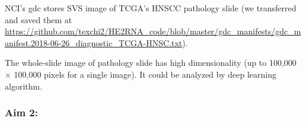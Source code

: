 \documentclass[12pt, a4paper]{article}
\begin{document}

NCI's \acrfull{gdc} stores SVS image of TCGA's HNSCC pathology slide (we transferred and saved them at \url{https://github.com/texchi2/HE2RNA_code/blob/master/gdc_manifests/gdc_manifest.2018-06-26_diagnostic_TCGA-HNSC.txt}).



The whole-slide image of pathology slide has high dimensionality (up to 100,000 × 100,000 pixels for a single image). It could be analyzed by deep learning algorithm.



\clearpage

\subsubsection*{Aim 2:}






\clearpage


\end{document}
